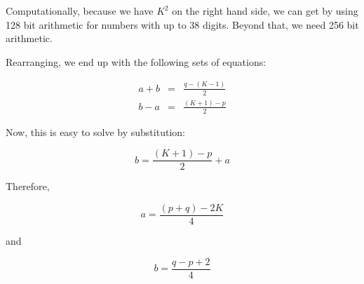 \documentclass[12pt,letterpaper]{article}
\begin{document}
Computationally, because we have $K^2$ on the right hand side, we can get by using 128 bit arithmetic for numbers with up to 38 digits. Beyond that, we need 256 bit arithmetic.

Rearranging, we end up with the following sets of equations:

\begin{eqnarray}
%
a + b & = & \frac{q - (K - 1)}{2} \\
%
b - a & = & \frac{(K + 1) - p}{2}
%
\end{eqnarray}

Now, this is easy to solve by substitution:

\begin{equation}
    b = \frac{(K + 1) - p}{2} + a
\end{equation}

Therefore,

\begin{equation}
    a = \frac{(p + q) - 2K}{4}
\end{equation}

and

\begin{equation}
    b = \frac{q - p + 2}{4}
\end{equation}
\end{document}
